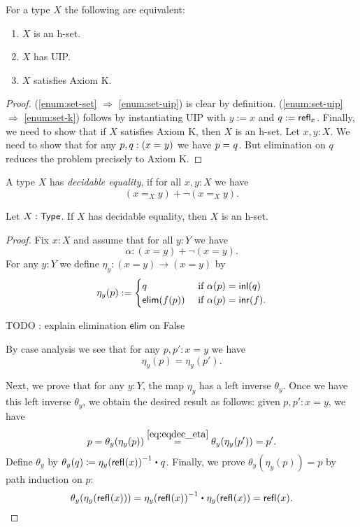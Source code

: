 \begin{thm}\label{thm:h-set-uip-K}
 For a type $X$ the following are equivalent:
 \begin{enumerate}
  \item\label{enum:set-set} $X$ is an h-set.
  \item\label{enum:set-uip} $X$ has UIP.
  \item\label{enum:set-k} $X$ satisfies Axiom K.
 \end{enumerate}
\end{thm}

\begin{proof} (\ref{enum:set-set} $\Rightarrow$ \ref{enum:set-uip}) is clear by definition. (\ref{enum:set-uip} $\Rightarrow$ \ref{enum:set-k}) follows by instantiating UIP with $y := x$ and $q := \mathsf{refl}_{x}$.
Finally, we need to show that if $X$ satisfies Axiom K, then $X$ is an h-set. Let $x, y : X$. We need to show that for any $p, q : (x =_{} y)$ we have $p =_{} q$. But elimination on $q$ reduces the problem precisely to Axiom K.
\end{proof}

\begin{defn}
 A type $X$ has {\em decidable equality}, if for all $x, y : X$ we have
 \[(x =_X y) + \neg (x =_X y).\]
\end{defn}

\begin{thm}
 Let $X : \mathsf{Type}$. If $X$ has decidable equality, then $X$ is an h-set.
\end{thm}

\begin{proof}
Fix $x : X$ and assume that for all $y : Y$ we have 
  \[\alpha : (x = y) + \neg (x = y). \]
  For any $y : Y$ we define
      $  \eta_y : (x = y) \to (x = y) $
    by
    \[ \eta_y(p) := \begin{cases}
                     q & \text{ if } \alpha(p) = \mathsf{inl}(q) \\
                     \mathsf{elim}(f(p)) & \text{ if } \alpha(p) = \mathsf{inr}(f).
                    \end{cases}
\]

TODO : explain elimination $\mathsf{elim}$ on False 

\noindent
 By case analysis we see that for any $p, p' : x = y$ we have 
 \begin{equation}\eta_y(p) = \eta_y(p') . \label{eq:eqdec_eta}\end{equation}

 \noindent
 Next, we prove that for any $y : Y$, the map $\eta_y$ has a left inverse $\theta_y$. 
   Once we have this left inverse $\theta_y$, we obtain the desired result as follows: given 
     $p, p' : x = y$, we have
   \[ p = \theta_y (\eta_y(p)) \stackrel{\ref{eq:eqdec_eta}}{=} \theta_y (\eta_y(p')) = p' . \]
 Define $\theta_y$ by 
     $\theta_y(q) \defeq \opp{\eta_y(\refl{}(x))} \ct q$.
  Finally, we prove $\theta_y(\eta_y(p)) = p$ by path induction on $p$:
   \[\theta_y(\eta_y(\refl{}(x))) = \opp{\eta_y(\refl{}(x))} \ct \eta_y(\refl{}(x)) = \refl{}(x). \]

\end{proof}

